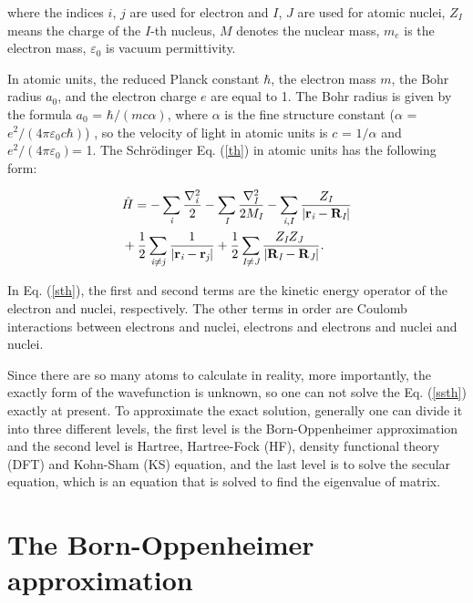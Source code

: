 \documentclass[a4paper, 12pt, titlepage,oneside,drop]{kthesis}
\begin{document}
\noindent where the indices $\textit{i}$, $\textit{j}$ are used for electron and $\textit{I}$, $\textit{J}$ are used for atomic nuclei, $Z_\textit{I}$ means the charge of the $\textit{I}$-th nucleus,
$\textit{M}$ denotes the nuclear mass, $m_e$ is the electron mass, $\varepsilon_0$ is vacuum permittivity.

In atomic units, the reduced Planck constant $\hbar$, the electron mass $m$, the Bohr radius $a_0$, and the electron charge
$e$ are equal to 1. The Bohr radius is given by the formula $a_0$ = ${\hbar} / {(mc\alpha)}$, where $\alpha$ is the fine structure
constant ($\alpha$ = ${e^2}/{(4 \pi \varepsilon_0 c \hbar)}$) , so the velocity of light in atomic units is $c$ = $1/{\alpha}$ and ${e^2}/{(4 \pi \varepsilon_0)}$= 1. The Schrödinger Eq. (\ref{th}) in atomic units has 
the following form:

\begin{equation}\label{sth}\begin{split}
&\hath = - \sumi<i>   \frac{{{\nabla}_{\textit{i}}^{2}}}{2} - \sumi<I> \frac{{{\nabla}_{\textit{I}}^{2}}}{2 M_\textit{I}}  - \sumij<i><I> \frac{Z_\textit{I}}{|\textbf{r}_\textit{i}-\textbf{R}_\textit{I}|} \\
& + \frac{1}{2} \suminj<i><j> \frac{1}{ |\textbf{r}_\textit{i}-\textbf{r}_\textit{j}|} + \frac{1}{2} \suminj<I><J> \frac{Z_\textit{I} Z_\textit{J}\ }{|\textbf{R}_\textit{I}-\textbf{R}_\textit{J}|}.
\end{split}\end{equation}


\noindent In Eq. (\ref{sth}), the first and second terms are the kinetic energy operator of the electron and nuclei, respectively.
The other terms in order are Coulomb interactions between electrons and nuclei, electrons and electrons and nuclei and nuclei.

\noindent Since there are so many atoms to calculate in reality, more importantly, the exactly form of the wavefunction is unknown,
so one can not solve the Eq. (\ref{ssth}) exactly at present. To approximate the exact solution, 
generally one can divide it into three different levels, the first level is the Born-Oppenheimer approximation and the second level is Hartree,
Hartree-Fock (HF), density functional theory (DFT) and Kohn-Sham (KS) equation, and the last level is to solve the secular equation, 
which is an equation that is solved to find the eigenvalue of matrix.

\section{The Born-Oppenheimer approximation}
\label{ch:boa}
\end{document}
